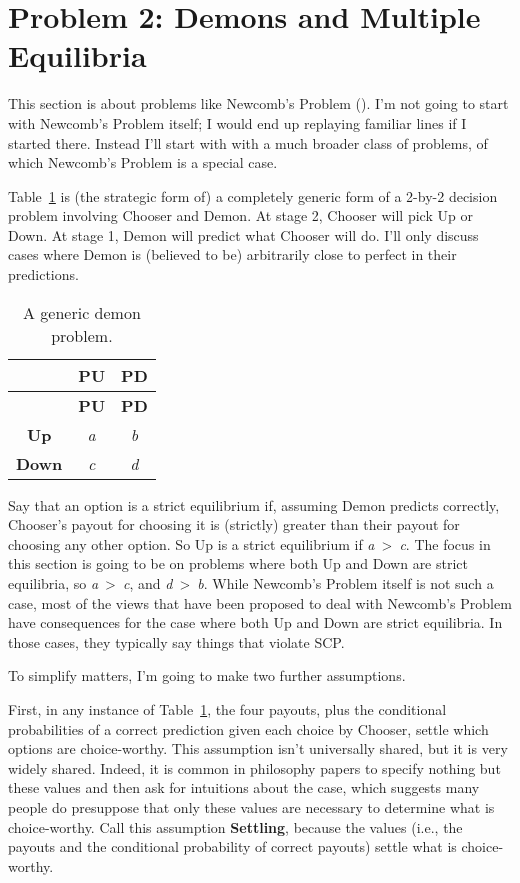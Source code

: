 \documentclass[
  10pt,
  letterpaper,
  DIV=11,
  numbers=noendperiod,
  twoside]{scrartcl}
\begin{document}
\section{Problem 2: Demons and Multiple Equilibria}\label{sec-multiple}

This section is about problems like Newcomb's Problem
(). I'm not going to start with
Newcomb's Problem itself; I would end up replaying familiar lines if I
started there. Instead I'll start with with a much broader class of
problems, of which Newcomb's Problem is a special case.

Table~\ref{tbl-generic-demon} is (the strategic form of) a completely
generic form of a 2-by-2 decision problem involving Chooser and Demon.
At stage 2, Chooser will pick Up or Down. At stage 1, Demon will predict
what Chooser will do. I'll only discuss cases where Demon is (believed
to be) arbitrarily close to perfect in their predictions.

\begin{longtable}[]{@{}ccc@{}}
\caption{A generic demon
problem.}\label{tbl-generic-demon}\tabularnewline
\toprule\noalign{}
& \textbf{PU} & \textbf{PD} \\
\midrule\noalign{}
\endfirsthead
\toprule\noalign{}
& \textbf{PU} & \textbf{PD} \\
\midrule\noalign{}
\endhead
\bottomrule\noalign{}
\endlastfoot
\textbf{Up} & \emph{a} & \emph{b} \\
\textbf{Down} & \emph{c} & \emph{d} \\
\end{longtable}

Say that an option is a strict equilibrium if, assuming Demon predicts
correctly, Chooser's payout for choosing it is (strictly) greater than
their payout for choosing any other option. So Up is a strict
equilibrium if \emph{a}~\textgreater~\emph{c}. The focus in this section
is going to be on problems where both Up and Down are strict equilibria,
so \emph{a}~\textgreater~\emph{c}, and \emph{d}~\textgreater~\emph{b}.
While Newcomb's Problem itself is not such a case, most of the views
that have been proposed to deal with Newcomb's Problem have consequences
for the case where both Up and Down are strict equilibria. In those
cases, they typically say things that violate SCP.

To simplify matters, I'm going to make two further assumptions.

First, in any instance of Table~\ref{tbl-generic-demon}, the four
payouts, plus the conditional probabilities of a correct prediction
given each choice by Chooser, settle which options are choice-worthy.
This assumption isn't universally shared, but it is very widely shared.
Indeed, it is common in philosophy papers to specify nothing but these
values and then ask for intuitions about the case, which suggests many
people do presuppose that only these values are necessary to determine
what is choice-worthy. Call this assumption \textbf{Settling}, because
the values (i.e., the payouts and the conditional probability of correct
payouts) settle what is choice-worthy.
\end{document}
